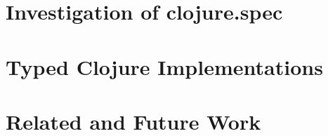 \documentclass[11pt]{iuthesis}
\begin{document}
\part{Investigation of clojure.spec}
\label{part:spec}





\part{Typed Clojure Implementations}



\part*{Related and Future Work}





\end{document}
